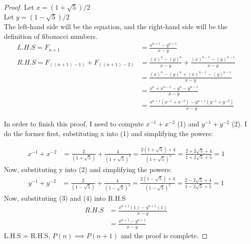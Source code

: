 \documentclass[11pt]{article}
\begin{document}
\begin{enumerate}
{\begin{enumerate}
{\begin{theorem}
\begin{proof}
Let $x = (1 + \sqrt{5})/2$\\
Let $y = (1 - \sqrt{5})/2$\\
The left-hand side will be the equation, and the right-hand side will be the definition of fibonacci numbers.
\begin{align*}
L.H.S = F_{n + 1} & = \frac{x^{n + 1} - y^{n + 1}}{x - y} \\
R.H.S = F_{((n + 1) - 1)} + F_{((n + 1) - 2)} & = \frac{(x)^{n} - (y)^{n}}{x - y} + \frac{(x)^{n - 1} - (y)^{n - 1}}{x - y} \\
& = \frac{(x)^{n} - (y)^{n} + (x)^{n - 1} - (y)^{n - 1}}{x - y} \\
& = \frac{x^n + x^{n-1} - y^{n} - y^{n-1}}{x - y} \\
& = \frac{x^{n + 1}(x^{-1} + x^{-2}) - y^{n + 1}(y^{-1} + y^{-2})}{x - y}
\end{align*}

In order to finish this proof, I need to compute $x^{-1} + x^{-2}$ (1) and $y^{-1} + y^{-2}$ (2). I do the former first, substituting x into (1) and simplifying the powers:

\setcounter{equation}{2}

\begin{align}
x^{-1} + x^{-2} & = \frac{2}{(1 + \sqrt{5})} + \frac{4}{(1 + \sqrt{5})^2}
= \frac{2(1 + \sqrt{5}) + 4}{(1 + \sqrt{5})^2}
= \frac{2 + 2\sqrt{5} + 4}{1 + 2\sqrt{5} + 5}
= 1
\end{align}
Now, substituting y into (2) and simplifying the powers:
\begin{align}
y^{-1} + y^{-2} & = \frac{2}{(1 - \sqrt{5})} + \frac{4}{(1 - \sqrt{5})^2}
= \frac{2(1 - \sqrt{5}) + 4}{(1 - \sqrt{5})^2}
= \frac{2 - 2\sqrt{5} + 4}{1 - 2\sqrt{5} + 5}
= 1
\end{align}
Now, substituting (3) and (4) into R.H.S
\begin{align*}
R.H.S &= \frac{x^{n + 1}(1) - y^{n + 1}(1)}{x - y} \\
&= \frac{x^{n + 1} - y^{n + 1}}{x - y}
\end{align*}
L.H.S = R.H.S, $P(n) \implies P(n + 1)$ and the proof is complete.
\end{proof}
\end{theorem}
}
\end{enumerate}
}


\end{enumerate}
\end{document}
